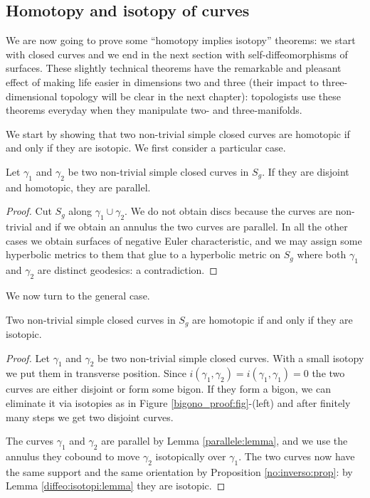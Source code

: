 \subsection{Homotopy and isotopy of curves}
We are now going to prove some ``homotopy implies isotopy'' theorems: we start with closed curves and we end in the next section with self-diffeomorphisms of surfaces. These slightly technical theorems have the remarkable and pleasant effect of making life easier in dimensions two and three (their impact to three-dimensional topology will be clear in the next chapter): topologists use these theorems everyday when they manipulate two- and three-manifolds.

We start by showing that two non-trivial simple closed curves are homotopic if and only if they are isotopic. We first consider a particular case.

\begin{lemma} \label{parallele:lemma}
Let $\gamma_1$ and $\gamma_2$ be two non-trivial simple closed curves in $S_g$. If they are disjoint and homotopic, they are parallel. 
\end{lemma}
\begin{proof}
Cut $S_g$ along $\gamma_1\cup \gamma_2$. We do not obtain discs because the curves are non-trivial and if we obtain an annulus the two curves are parallel. In all the other cases we obtain surfaces of negative Euler characteristic, and we may assign some hyperbolic metrics to them that glue to a hyperbolic metric on $S_g$ where both $\gamma_1$ and $\gamma_2$ are distinct geodesics: a contradiction.
\end{proof}

We now turn to the general case. 

\begin{prop} \label{ambiente:prop}
Two non-trivial simple closed curves in $S_g$ are homotopic if and only if they are isotopic. 
\end{prop}
\begin{proof}
Let $\gamma_1$ and $\gamma_2$ be two non-trivial simple closed curves. With a small isotopy we put them in transverse position. 
Since $i(\gamma_1,\gamma_2) = i(\gamma_1,\gamma_1)=0$ the two curves are either disjoint or form some bigon. If they form a bigon, we can eliminate it via isotopies as in Figure \ref{bigono_proof:fig}-(left) and after finitely many steps we get two disjoint curves.

The curves $\gamma_1$ and $\gamma_2$ are parallel by Lemma \ref{parallele:lemma}, and we use the annulus they cobound to move $\gamma_2$ isotopically over $\gamma_1$. The two curves now have the same support and the same orientation by Proposition \ref{no:inverso:prop}: by Lemma \ref{diffeo:isotopi:lemma} they are isotopic. 
\end{proof}

